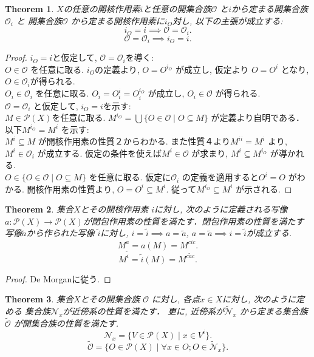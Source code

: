 \documentclass[lualatex]{ltjsbook}
\newtheorem{theorem}{Theorem}[chapter]
\theoremstyle{remark}
\theoremstyle{plain}
\begin{document}
\begin{theorem}
	$X$の任意の開核作用素$i$と任意の開集合族$\mathcal{O}$ 
	と$i$から定まる開集合族 $\mathcal{O}_i$ と
	開集合族$\mathcal{O}$ から定まる開核作用素に$i_O$対し,  以下の主張が成立する:
	\[
	i_O = i \implies \mathcal{O} = \mathcal{O}_i
	.\] 
	\[
	\mathcal{O} = \mathcal{O}_i \implies i_O = i
	.\] 
\end{theorem}

\begin{proof}
	$i_O = i $と仮定して,   $\mathcal{O} = \mathcal{O}_i$を導く:\\
	$O \in \mathcal{O}$ を任意に取る. $i_O$の定義より,   $O = O^{i_O}$ が成立し,  
	仮定より $O = O ^{i}$ となり,  $O \in \mathcal{O}_i$が得られる.\\
	$O_i \in \mathcal{O}_i$ を任意に取る. $O_i = O_i^{i} = O_i^{i_O}$ が成立し,  $O_i \in \mathcal{O}$ が得られる.\\
	$\mathcal{O} = \mathcal{O}_i$ と仮定して,  $i_O =i$を示す:\\
	 $M \in \mathcal{P}(X)$を任意に取る. 
	 $M ^{i_O} = \bigcup \{O \in \mathcal{O} \mid O\subseteq M\} $ が定義より自明である．\\
	 以下$M^{i_O} = M^{i}$ を示す:\\
	 $M^{i} \subseteq M$ が開核作用素の性質２からわかる.
	 また性質４より$M^{ii}=M^{i}$ より,  $M^{i} \in \mathcal{O}_i$ が成立する. 
	 仮定の条件を使えば$M^{i} \in \mathcal{O}$ が求まり,  $M^{i} \subseteq M^{i_O}$ が導かれる.\\
	 $O \in \{O \in \mathcal{O} \mid O\subseteq M\} $ を任意に取る. 
	 仮定に$\mathcal{O}_i$ の定義を適用すると$O^{i}= O$ がわかる.
	 開核作用素の性質より,  $O = O^{i} \subseteq M^{i}$. 従って$M^{i_O} \subseteq  M^{i}$ が示される.
\end{proof}

\begin{theorem}
	集合$X$とその開核作用素 $i$に対し,   次のように定義される写像$a : \mathcal{P}(X) \to \mathcal{P}(X)$が閉包作用素の性質を満たす．閉包作用素の性質を満たす写像$\tilde{a}$から作られた写像 $\tilde{i}$に対し,    $ i = \tilde{i} \implies a = \tilde{a}$,  $a =\tilde{a} \implies i = \tilde{i}$が成立する.
	\[
		M^{a}= a(M) = M^{cic}
	.\] 
	\[
		M^{\tilde{i}}= \tilde{i}(M) = M^{c\tilde{a}c}
	.\] 
\end{theorem}

\begin{proof}
	De Morganに従う.
\end{proof}

\begin{theorem}
	集合$X$とその開集合族 $\mathcal{O}$ に対し,  各点$x \in X$に対し,  次のように定める 集合族$\mathcal{N}_x$が近傍系の性質を満たす． 更に,  近傍系が$\mathcal{\tilde{N}}_x$ から定まる集合族$\tilde{\mathcal{O}}$ が開集合族の性質を満たす.
	\[
	 \mathcal{N}_x =\{ V \in \mathcal{P}(X)  \mid  x \in V^{i}\} 
	.\] 
	\[
		\tilde{\mathcal{O}}= \{ O \in \mathcal{P}(X)  \mid \forall x \in O; O \in \mathcal{\tilde{N}}_x\} 
	.\] 
\end{theorem}
\end{document}
